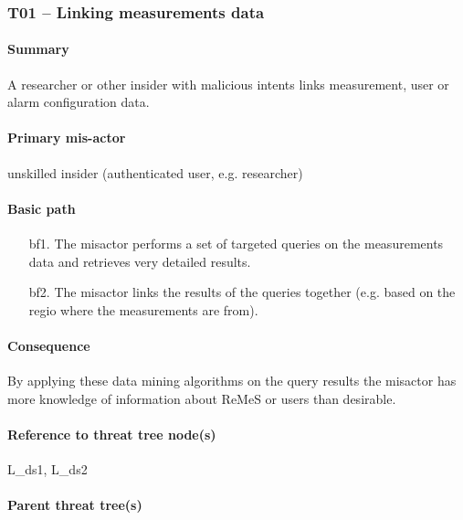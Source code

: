 \subsubsection{T01 -- Linking measurements data}
\label{threats:t01}

\paragraph{Summary}

\npar A researcher or other insider with malicious intents links measurement,
user or alarm configuration data.

\paragraph{Primary mis-actor}

\npar unskilled insider (authenticated user, e.g. researcher)

\paragraph{Basic path}
\begin{enumerate}
	\item[bf1.] The misactor performs a set of targeted queries on the
	measurements data and retrieves very detailed results.
    \item[bf2.] The misactor links the results of the queries together (e.g.
    based on the regio where the measurements are from).
\end{enumerate}

\paragraph{Consequence}

\npar By applying these data mining algorithms on the query results the misactor
has more knowledge of information about ReMeS or users than desirable. 

\paragraph{Reference to threat tree node(s)} 

L\_ds1, L\_ds2


\paragraph{Parent threat tree(s)}

